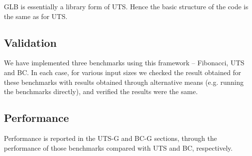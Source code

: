 GLB is essentially a library form of UTS. Hence the basic structure of
the code is the same as for UTS. 


\subsection{Validation}
We have implemented three benchmarks using this framework --
Fibonacci, UTS and BC. In each case, for various input sizes we
checked the result obtained for these benchmarks with results obtained
through alternative means (e.g. running the benchmarks directly), and
verified the results were the same.

\subsection{Performance} Performance is reported in the UTS-G
and BC-G sections, through the performance of those benchmarks
compared with UTS and BC, respectively.
